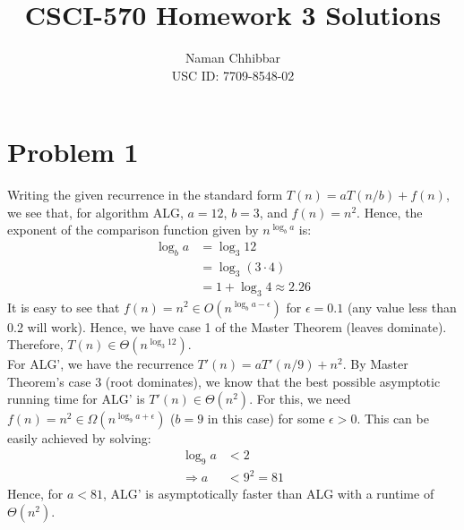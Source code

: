 \documentclass{article}
\title{CSCI-570 Homework 3 Solutions}
\author{
  Naman Chhibbar \\
  USC ID: 7709-8548-02
}
\date{}
\begin{document}
\maketitle

\section{Problem 1}
  Writing the given recurrence in the standard form $T(n) = aT(n/b) + f(n)$, we see that, for algorithm ALG, $a = 12$, $b = 3$, and $f(n) = n^2$.
  Hence, the exponent of the comparison function given by $n^{\log_b a}$ is:
  \begin{align*}
    \log_b a &= \log_3 12 \\
    &= \log_3 (3 \cdot 4) \\
    &= 1 + \log_3 4 \approx 2.26
  \end{align*}
  It is easy to see that $f(n) = n^2 \in O(n^{\log_b a - \epsilon})$ for $\epsilon = 0.1$ (any value less than 0.2 will work).
  Hence, we have case 1 of the Master Theorem (leaves dominate).
  Therefore, $T(n) \in \Theta(n^{\log_3 12})$. \\

  For ALG', we have the recurrence $T'(n) = aT'(n/9) + n^2$.
  By Master Theorem's case 3 (root dominates), we know that the best possible asymptotic running time for ALG' is $T'(n) \in \Theta(n^2)$.
  For this, we need $f(n) = n^2 \in \Omega(n^{\log_9 a + \epsilon})$ ($b = 9$ in this case) for some $\epsilon > 0$.
  This can be easily achieved by solving:
  \begin{align*}
    \log_9 a &< 2 \\
    \Rightarrow a &< 9^2 = 81
  \end{align*}
  Hence, for $a < 81$, ALG' is asymptotically faster than ALG with a runtime of $\Theta(n^2)$.
\end{document}
